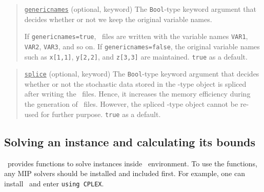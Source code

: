 \begin{quote}
	\noindent\underline{\texttt{genericnames}} (optional, keyword) The \texttt{Bool}-type keyword argument that decides whether or not we keep the original variable names. 
	
	If \texttt{genericnames=true}, \smps\ files are written with the variable names \texttt{VAR1}, \texttt{VAR2}, \texttt{VAR3}, and so on. If \texttt{genericnames=false}, the original variable names such as \texttt{x[1,1]}, \texttt{y[2,2]}, and \texttt{z[3,3]} are maintained. \texttt{true} as a default.
\end{quote}

\begin{quote}
	\noindent\underline{\texttt{splice}} (optional, keyword) The \texttt{Bool}-type keyword argument that decides whether or not the stochastic data stored in the \jumpmodel-type object is spliced after writing the \smps\ files. Hence, it increases the memory efficiency during the generation of \smps\ files. However, the spliced \jumpmodel-type object cannot be re-used for further purpose. \texttt{true} as a default.
\end{quote}


%
%

\subsection{Solving an instance and calculating its bounds} \label{tutorial:solve_instance}
\siplibjl\ provides functions to solve instances inside \julia\ environment. To use the functions, any MIP solvers should be installed and included first. For example, one can install \cplex\ and enter \texttt{using CPLEX}.
